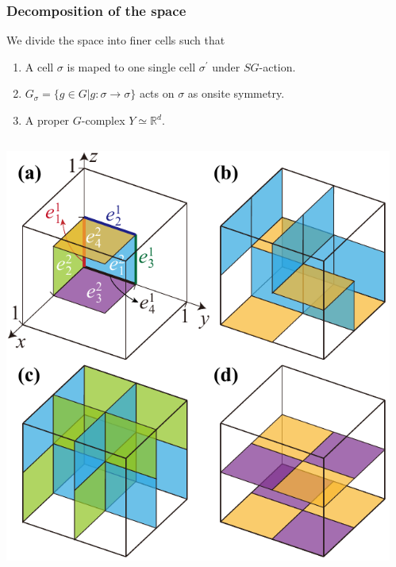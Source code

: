 \documentclass[xcolor=table, aspectratio=169,ignorenonframetext]{beamer}
\begin{document}
\begin{frame}
	\frametitle{Decomposition of the space}
	We divide the space into finer cells such that
	\begin{enumerate}
		\item A cell $\sigma$ is maped to one single cell $\sigma^\prime$ under $SG$-action.
		\item $G_\sigma=\{g\in G|g:\sigma\rightarrow\sigma\}$ acts on $\sigma$ as onsite symmetry.
		\item A proper $G$-complex $Y\simeq \mathbb R^d$.
	\end{enumerate}
	\begin{columns}
		\begin{center}
			\includegraphics[width=.5\textwidth]{../spspt/blocks}
		\end{center}
		\begin{center}
		\end{center}
	\end{columns}
\end{frame}
\end{document}
